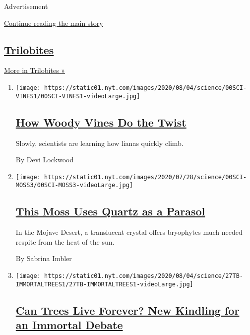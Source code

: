 Advertisement

\protect\hyperlink{after-mid1}{Continue reading the main story}

\hypertarget{trilobites-4}{%
\subsection{\texorpdfstring{\href{/column/trilobites}{Trilobites}}{Trilobites}}\label{trilobites-4}}

\href{/column/trilobites}{More in Trilobites »}

\begin{enumerate}
\def\labelenumi{\arabic{enumi}.}
\item
  \texttt{[image: https://static01.nyt.com/images/2020/08/04/science/00SCI-VINES1/00SCI-VINES1-videoLarge.jpg]}

  \hypertarget{how-woody-vines-do-the-twist}{%
  \subsection{\texorpdfstring{\href{/2020/08/01/science/vines-lianas-panama.html}{How
  Woody Vines Do the
  Twist}}{How Woody Vines Do the Twist}}\label{how-woody-vines-do-the-twist}}

  Slowly, scientists are learning how lianas quickly climb.

  By Devi Lockwood
\item
  \texttt{[image: https://static01.nyt.com/images/2020/07/28/science/00SCI-MOSS3/00SCI-MOSS3-videoLarge.jpg]}

  \hypertarget{this-moss-uses-quartz-as-a-parasol}{%
  \subsection{\texorpdfstring{\href{/2020/07/29/science/moss-quartz-biology-syntrichia.html}{This
  Moss Uses Quartz as a
  Parasol}}{This Moss Uses Quartz as a Parasol}}\label{this-moss-uses-quartz-as-a-parasol}}

  In the Mojave Desert, a translucent crystal offers bryophytes
  much-needed respite from the heat of the sun.

  By Sabrina Imbler
\item
  \texttt{[image: https://static01.nyt.com/images/2020/08/04/science/27TB-IMMORTALTREES1/27TB-IMMORTALTREES1-videoLarge.jpg]}

  \hypertarget{can-trees-live-forever-new-kindling-for-an-immortal-debate}{%
  \subsection{\texorpdfstring{\href{/2020/07/27/science/trees-immortality.html}{Can
  Trees Live Forever? New Kindling for an Immortal
  Debate}}{Can Trees Live Forever? New Kindling for an Immortal Debate}}\label{can-trees-live-forever-new-kindling-for-an-immortal-debate}}


\end{enumerate}
